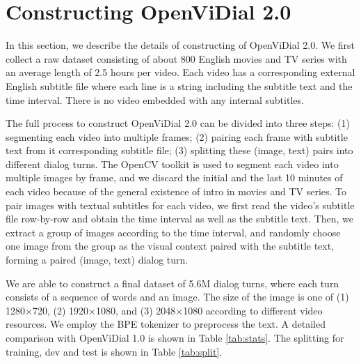 \documentclass[11pt,a4paper]{article}
\begin{document}
\section{Constructing OpenViDial 2.0}
In this section, we describe the details of constructing of OpenViDial 2.0. We first collect a raw dataset consisting of about 800 English movies and TV series with an average length of 2.5 hours per video. Each video has a corresponding external English subtitle file where each line is a string including the subtitle text and the time interval. There is no video embedded with any internal subtitles.

The full process to construct OpenViDial 2.0 can be divided into three steps: (1) segmenting each video into multiple frames; (2) pairing each frame with subtitle text from it corresponding subtitle file; (3) splitting these (image, text) pairs into different dialog turns. The OpenCV \cite{opencv_library} toolkit is used to segment each video into multiple images by frame, and we discard the initial and the last 10 minutes of each video because of the general existence of intro in movies and TV series. To pair images with textual subtitles for each video, we first read the video's subtitle file row-by-row and obtain the time interval as well as the subtitle text. Then, we extract a group of images according to the time interval, and randomly choose one image from the group as the visual context paired with the subtitle text, forming a paired (image, text) dialog turn.

We are able to construct a final dataset of 5.6M dialog turns, where each turn consists of a sequence of words and an image. The size of the image is one of (1) 1280$\times$720, (2) 1920$\times$1080, and (3) 2048$\times$1080 according to different video resources. We employ the BPE tokenizer \cite{sennrich-etal-2016-neural} to preprocess the text. A detailed comparison with OpenViDial 1.0 is shown in Table \ref{tab:stats}. The splitting for training, dev and test is shown in Table \ref{tab:split}.
\end{document}
